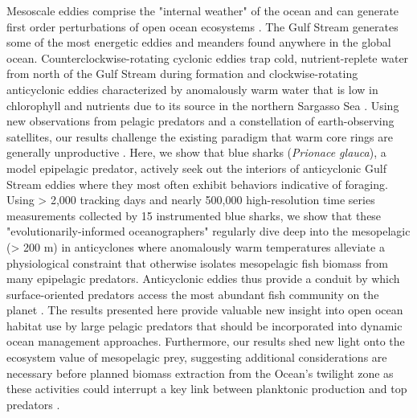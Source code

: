 

Mesoscale eddies comprise the "internal weather" of the ocean and can generate first order perturbations of open ocean ecosystems \citep{Mahadevan2014, McGillicuddy2007}. The Gulf Stream generates some of the most energetic eddies and meanders found anywhere in the global ocean.  Counterclockwise-rotating cyclonic eddies trap cold, nutrient-replete water from north of the Gulf Stream during formation and clockwise-rotating anticyclonic eddies characterized by anomalously warm water that is low in chlorophyll and nutrients due to its source in the northern Sargasso Sea \citep{Gaube2017DSR}. Using new observations from pelagic predators and a constellation of earth-observing satellites, our results challenge the existing paradigm that warm core rings are generally unproductive \citep{Gaube2017DSR, Williams1998}. Here, we show that blue sharks (\textit{Prionace glauca}), a model epipelagic predator, actively seek out the interiors of anticyclonic Gulf Stream eddies where they most often exhibit behaviors indicative of foraging. Using > 2,000 tracking days and nearly 500,000 high-resolution time series measurements collected by 15 instrumented blue sharks, we show that these "evolutionarily-informed oceanographers" regularly dive deep into the mesopelagic (> 200 m) in anticyclones where anomalously warm temperatures alleviate a physiological constraint that otherwise isolates mesopelagic fish biomass from many epipelagic predators. Anticyclonic eddies thus provide a conduit by which surface-oriented predators access the most abundant fish community on the planet \citep{Irigoien2014}. The results presented here provide valuable new insight into open ocean habitat use by large pelagic predators that should be incorporated into dynamic ocean management approaches. Furthermore, our results shed new light onto the ecosystem value of mesopelagic prey, suggesting additional considerations are necessary before planned biomass extraction from the Ocean's twilight zone as these activities could interrupt a key link between planktonic production and top predators \citep{Smith2011}.

